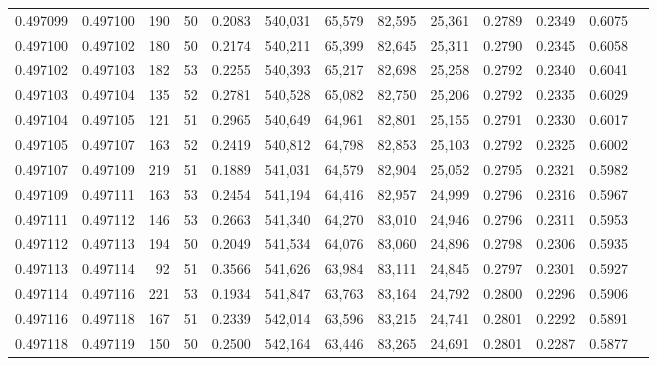 \begin{tabular}{rrrrrrrrrrrrr}
0.497099 & 0.497100 &   190 &  50 &                                     0.2083 & 540,031 &  65,579 &  82,595 &  25,361 & 0.2789 & 0.2349 & 0.6075 \\
0.497100 & 0.497102 &   180 &  50 &                                     0.2174 & 540,211 &  65,399 &  82,645 &  25,311 & 0.2790 & 0.2345 & 0.6058 \\
0.497102 & 0.497103 &   182 &  53 &                                     0.2255 & 540,393 &  65,217 &  82,698 &  25,258 & 0.2792 & 0.2340 & 0.6041 \\
0.497103 & 0.497104 &   135 &  52 &                                     0.2781 & 540,528 &  65,082 &  82,750 &  25,206 & 0.2792 & 0.2335 & 0.6029 \\
0.497104 & 0.497105 &   121 &  51 &                                     0.2965 & 540,649 &  64,961 &  82,801 &  25,155 & 0.2791 & 0.2330 & 0.6017 \\
0.497105 & 0.497107 &   163 &  52 &                                     0.2419 & 540,812 &  64,798 &  82,853 &  25,103 & 0.2792 & 0.2325 & 0.6002 \\
0.497107 & 0.497109 &   219 &  51 &                                     0.1889 & 541,031 &  64,579 &  82,904 &  25,052 & 0.2795 & 0.2321 & 0.5982 \\
0.497109 & 0.497111 &   163 &  53 &                                     0.2454 & 541,194 &  64,416 &  82,957 &  24,999 & 0.2796 & 0.2316 & 0.5967 \\
0.497111 & 0.497112 &   146 &  53 &                                     0.2663 & 541,340 &  64,270 &  83,010 &  24,946 & 0.2796 & 0.2311 & 0.5953 \\
0.497112 & 0.497113 &   194 &  50 &                                     0.2049 & 541,534 &  64,076 &  83,060 &  24,896 & 0.2798 & 0.2306 & 0.5935 \\
0.497113 & 0.497114 &    92 &  51 &                                     0.3566 & 541,626 &  63,984 &  83,111 &  24,845 & 0.2797 & 0.2301 & 0.5927 \\
0.497114 & 0.497116 &   221 &  53 &                                     0.1934 & 541,847 &  63,763 &  83,164 &  24,792 & 0.2800 & 0.2296 & 0.5906 \\
0.497116 & 0.497118 &   167 &  51 &                                     0.2339 & 542,014 &  63,596 &  83,215 &  24,741 & 0.2801 & 0.2292 & 0.5891 \\
0.497118 & 0.497119 &   150 &  50 &                                     0.2500 & 542,164 &  63,446 &  83,265 &  24,691 & 0.2801 & 0.2287 & 0.5877 \\

\end{tabular}
